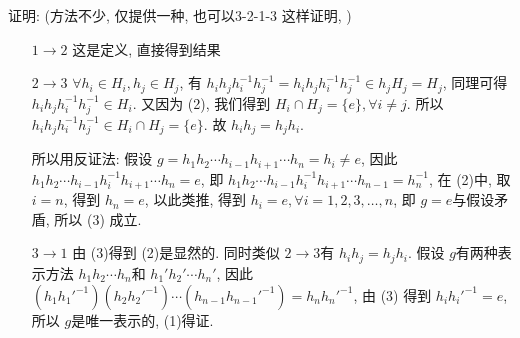 \documentclass[a4paper,12pt]{ctexart}
\begin{document}
    证明: (方法不少, 仅提供一种, 也可以3-2-1-3 这样证明, ) \begin{enumerate}
      \item[$1\rightarrow 2$] 这是定义, 直接得到结果
      \item[$2\rightarrow 3$] $ \forall h_i\in H_i,h_j\in H_j $, 有 $ h_ih_jh_i^{-1}h_j^{-1}=h_ih_jh_i^{-1}h_j^{-1}\in h_jH_j=H_j $, 
      同理可得 $ h_ih_jh_i^{-1}h_j^{-1}\in H_i $. 又因为 (2), 我们得到 
      $ H_i\cap H_j=\{e\},\forall i\neq j $. 所以 $ h_ih_jh_i^{-1}h_j^{-1}\in H_i\cap H_j=\{e\} $. 
      故 $ h_ih_j=h_jh_i $.
      
      所以用反证法: 假设 $ g=h_1h_2\cdots h_{i-1}h_{i+1}\cdots h_n=h_i\neq e $,
      因此 $ h_1h_2\cdots h_{i-1}h_i^{-1}h_{i+1}\cdots h_n=e $, 
      即 $ h_1h_2\cdots h_{i-1}h_i^{-1}h_{i+1}\cdots h_{n-1}=h_n^{-1} $, 在 (2)中, 取$ i=n $, 
      得到 $ h_n=e $, 以此类推, 得到 $ h_i=e,\forall i=1,2,3,\dots,n $, 即 $ g=e $与假设矛盾, 
      所以 (3) 成立.
      \item[$3\rightarrow 1$] 由 (3)得到 (2)是显然的. 同时类似 $ 2\rightarrow 3 $有 $ h_ih_j=h_jh_i $.
      假设 $ g $有两种表示方法 $ h_1h_2\cdots h_n $和 $ h_1'h_2'\cdots h_n' $, 
      因此 $ (h_1h_1'^{-1})(h_2h_2'^{-1})\cdots (h_{n-1}h_{n-1}'^{-1})=h_nh_n'^{-1} $, 由 (3)
      得到 $ h_ih_i'^{-1}=e $, 所以 $ g $是唯一表示的, (1)得证.  
    \end{enumerate}
\end{document}

